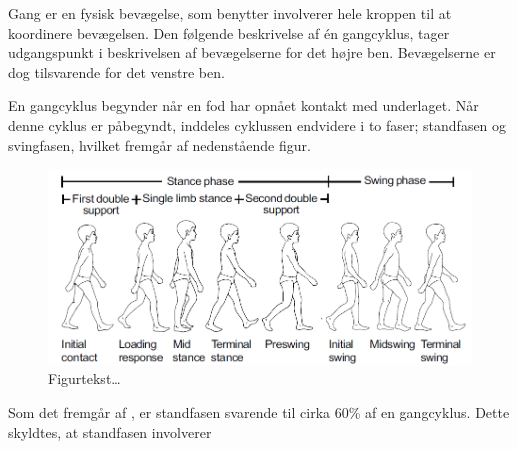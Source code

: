 Gang er en fysisk bevægelse, som benytter involverer hele kroppen til at koordinere bevægelsen. Den følgende beskrivelse af én gangcyklus, tager udgangspunkt i beskrivelsen af bevægelserne for det højre ben. Bevægelserne er dog tilsvarende for det venstre ben. \citep{VaughanDavisOConnor1992}

En gangcyklus begynder når en fod har opnået kontakt med underlaget. Når denne cyklus er påbegyndt, inddeles cyklussen endvidere i to faser; standfasen og svingfasen, hvilket fremgår af nedenstående figur. 

\begin{figure}[H]
	\centering
	\includegraphics[scale=0.55]{figures/bProblemloesning/gang_cyklus.png}
	\caption{Figurtekst…  \cite{ VaughanDavisOConnor1992}}
	\label{fig:gang_cyklus}
\end{figure}

Som det fremgår af , er standfasen svarende til cirka 60\% af en gangcyklus. Dette skyldtes, at standfasen involverer 
